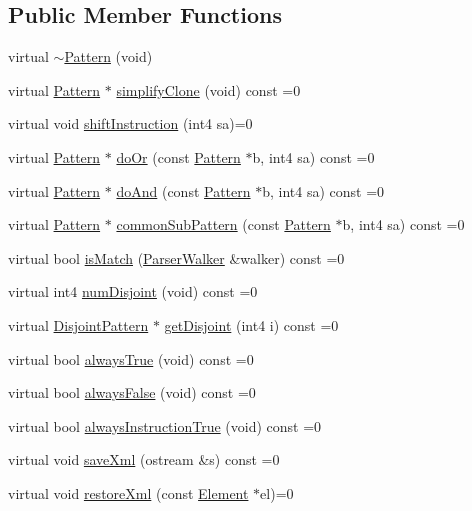 \subsection*{Public Member Functions}
\begin{DoxyCompactItemize}
\item 
virtual \mbox{\hyperlink{class_pattern_a5265f23b626aef409247e32b874ba308}{$\sim$\+Pattern}} (void)
\item 
virtual \mbox{\hyperlink{class_pattern}{Pattern}} $\ast$ \mbox{\hyperlink{class_pattern_a9c2c1383d7f836f8af237a03e463d94d}{simplify\+Clone}} (void) const =0
\item 
virtual void \mbox{\hyperlink{class_pattern_a8a84c1487128e33cdc27c2069eb4c02a}{shift\+Instruction}} (int4 sa)=0
\item 
virtual \mbox{\hyperlink{class_pattern}{Pattern}} $\ast$ \mbox{\hyperlink{class_pattern_a130c23bfea1cb4a1c6e83edf9e2503d3}{do\+Or}} (const \mbox{\hyperlink{class_pattern}{Pattern}} $\ast$b, int4 sa) const =0
\item 
virtual \mbox{\hyperlink{class_pattern}{Pattern}} $\ast$ \mbox{\hyperlink{class_pattern_a960f3e000e2642c452fe11f5b55a9589}{do\+And}} (const \mbox{\hyperlink{class_pattern}{Pattern}} $\ast$b, int4 sa) const =0
\item 
virtual \mbox{\hyperlink{class_pattern}{Pattern}} $\ast$ \mbox{\hyperlink{class_pattern_a54daed6fc84146ad309a25dfa8a68052}{common\+Sub\+Pattern}} (const \mbox{\hyperlink{class_pattern}{Pattern}} $\ast$b, int4 sa) const =0
\item 
virtual bool \mbox{\hyperlink{class_pattern_a2a85729a1c78a4905bd6ee1d11ea59d5}{is\+Match}} (\mbox{\hyperlink{class_parser_walker}{Parser\+Walker}} \&walker) const =0
\item 
virtual int4 \mbox{\hyperlink{class_pattern_acc63885639671e7813c6308d3c425ab2}{num\+Disjoint}} (void) const =0
\item 
virtual \mbox{\hyperlink{class_disjoint_pattern}{Disjoint\+Pattern}} $\ast$ \mbox{\hyperlink{class_pattern_a0404a3a426d9ed2afddde9c9c67f2f14}{get\+Disjoint}} (int4 i) const =0
\item 
virtual bool \mbox{\hyperlink{class_pattern_ab1527189c63b797a70c23047c033d35f}{always\+True}} (void) const =0
\item 
virtual bool \mbox{\hyperlink{class_pattern_ab7e66817fda44ad29954c8cfcb9c9266}{always\+False}} (void) const =0
\item 
virtual bool \mbox{\hyperlink{class_pattern_a62dd2f6b8bbb33279586739924ba4fa9}{always\+Instruction\+True}} (void) const =0
\item 
virtual void \mbox{\hyperlink{class_pattern_a1ad6c2ad66849318427095662b718fa9}{save\+Xml}} (ostream \&s) const =0
\item 
virtual void \mbox{\hyperlink{class_pattern_aaa8fb2873854fb42d944fa8876102bb5}{restore\+Xml}} (const \mbox{\hyperlink{class_element}{Element}} $\ast$el)=0
\end{DoxyCompactItemize}


